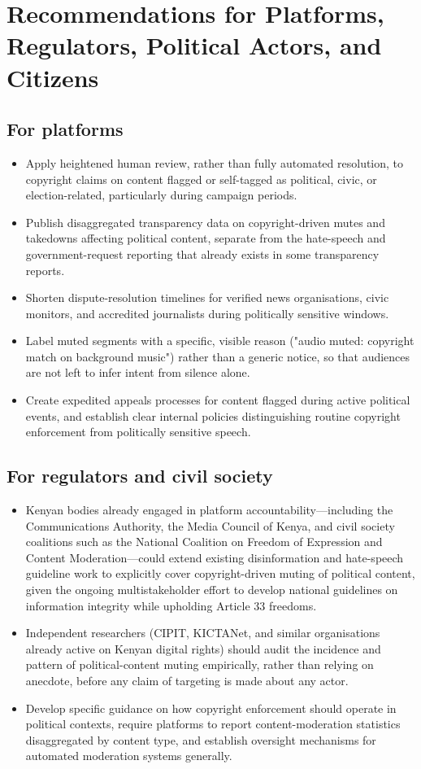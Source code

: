 \documentclass{article}
\begin{document}
\section{Recommendations for Platforms, Regulators, Political Actors, and Citizens}

\subsection*{For platforms}
\begin{itemize}
\item Apply heightened human review, rather than fully automated resolution, to copyright claims on content flagged or self-tagged as political, civic, or election-related, particularly during campaign periods.
\item Publish disaggregated transparency data on copyright-driven mutes and takedowns affecting political content, separate from the hate-speech and government-request reporting that already exists in some transparency reports.
\item Shorten dispute-resolution timelines for verified news organisations, civic monitors, and accredited journalists during politically sensitive windows.
\item Label muted segments with a specific, visible reason ("audio muted: copyright match on background music") rather than a generic notice, so that audiences are not left to infer intent from silence alone.
\item Create expedited appeals processes for content flagged during active political events, and establish clear internal policies distinguishing routine copyright enforcement from politically sensitive speech.
\end{itemize}

\subsection*{For regulators and civil society}
\begin{itemize}
\item Kenyan bodies already engaged in platform accountability—including the Communications Authority, the Media Council of Kenya, and civil society coalitions such as the National Coalition on Freedom of Expression and Content Moderation—could extend existing disinformation and hate-speech guideline work to explicitly cover copyright-driven muting of political content, given the ongoing multistakeholder effort to develop national guidelines on information integrity while upholding Article 33 freedoms.\cite{unesco2025}
\item Independent researchers (CIPIT, KICTANet, and similar organisations already active on Kenyan digital rights) should audit the incidence and pattern of political-content muting empirically, rather than relying on anecdote, before any claim of targeting is made about any actor.
\item Develop specific guidance on how copyright enforcement should operate in political contexts, require platforms to report content-moderation statistics disaggregated by content type, and establish oversight mechanisms for automated moderation systems generally.
\end{itemize}
\end{document}
